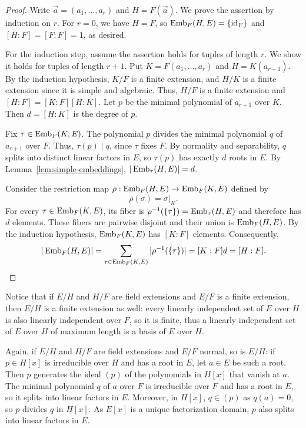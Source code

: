 \begin{proof}
Write $\vec a=(a_1,\ldots,a_r)$ and $H=F(\vec a)$.
We prove the assertion by induction on $r$.
For $r=0$, we have $H=F$, so $\operatorname{Emb}_F(H,E)=\{\mathrm{id}_F\}$ and $[H:F]=[F:F]=1$, as desired.

For the induction step, assume the assertion holds for tuples of length
$r$. We show it holds for 
tuples of length $r+1$.
Put $K=F(a_1,\ldots,a_r)$ and $H=K(a_{r+1})$.
By the induction hypothesis, $K/F$ is a finite extension, and $H/K$ is a finite extension since it is simple and algebraic.
Thus, $H/F$ is a finite extension and $[H:F]=[K:F][H:K]$.
Let $p$ be the minimal polynomial of $a_{r+1}$ over $K$.
Then $d=[H:K]$ is the degree of $p$.

Fix $\tau\in\operatorname{Emb}_F(K,E)$. The polynomial $p$ divides the
minimal polynomial $q$ of $a_{r+1}$ over $F$. Thus, $\tau(p)\mid q$, since $\tau$ fixes $F$.
By normality and separability, $q$ splits into distinct linear factors
in $E$, so $\tau(p)$ has exactly $d$ roots in $E$.
By Lemma~\ref{lem:simple-embeddings}, $|\operatorname{Emb}_{\tau}(H,E)|=d$.

Consider the restriction map $\rho:\operatorname{Emb}_F(H,E)\to\operatorname{Emb}_F(K,E)$ defined by
\[
 \rho(\sigma)=\sigma|_K.
\]
For every $\tau\in\operatorname{Emb}_F(K,E)$, its fiber is
$\rho^{-1}(\{\tau\})=\operatorname{Emb}_{\tau}(H,E)$ and therefore has $d$ elements.
These fibers are pairwise disjoint and their union is $\operatorname{Emb}_F(H,E)$.
By the induction hypothesis, $\operatorname{Emb}_F(K,E)$ has $[K:F]$ elements.
Consequently,
\[
 |\operatorname{Emb}_F(H,E)|
 =\sum_{\tau\in\operatorname{Emb}_F(K,E)}|\rho^{-1}(\{\tau\})|
 =[K:F]d=[H:F].
\]
\end{proof}

Notice that if $E/H$ and $H/F$ are field extensions and $E/F$ is a finite extension, then $E/H$ is a finite extension as well:
every linearly independent set of $E$ over $H$ is also
linearly independent over $F$, so it is finite, thus a
linearly independent set of $E$ over $H$ of maximum length is a basis of $E$ over $H$.

Again, if $E/H$ and $H/F$ are field extensions and $E/F$ normal, so is $E/H$: if $p\in H[x]$ is irreducible over $H$ and has a root in $E$, let $a \in E$ be such a root.
Then $p$ generates the ideal $(p)$ of the polynomials in $H[x]$ that vanish at $a$.
The minimal polynomial $q$ of $a$ over $F$ is irreducible over $F$ and has a root in $E$, so it splits into linear factors in $E$.
Moreover, in $H[x]$, $q\in (p)$ as $q(a)=0$, so $p$ divides $q$ in $H[x]$.
As $E[x]$ is a unique factorization domain, $p$ also splits into linear factors in $E$.

